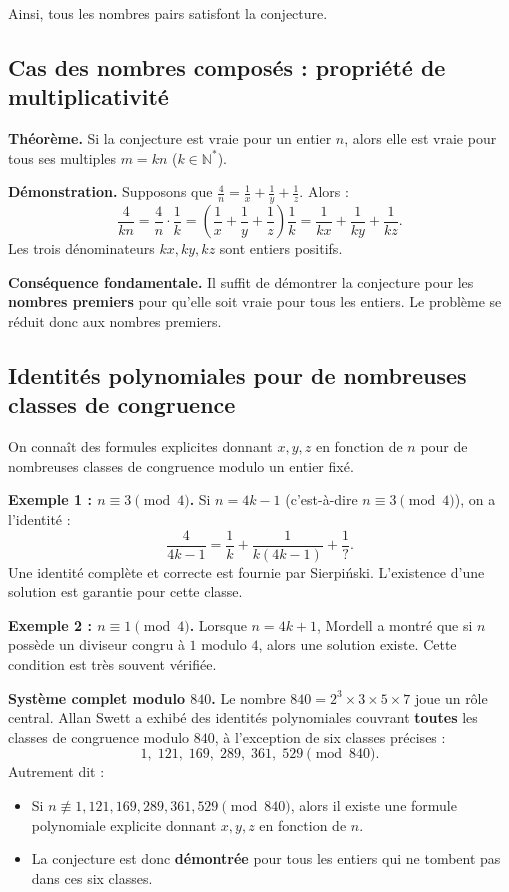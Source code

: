 \documentclass[12pt,a4paper]{article}
\begin{document}
\medskip
Ainsi, tous les nombres pairs satisfont la conjecture.

\subsection{Cas des nombres composés : propriété de multiplicativité}

\textbf{Théorème.} Si la conjecture est vraie pour un entier $n$, alors elle est vraie pour tous ses multiples $m = kn$ ($k \in \mathbb{N}^*$).

\textbf{Démonstration.} Supposons que $\frac{4}{n} = \frac{1}{x} + \frac{1}{y} + \frac{1}{z}$. Alors :
\[
\frac{4}{kn} = \frac{4}{n} \cdot \frac{1}{k}
= \left( \frac{1}{x} + \frac{1}{y} + \frac{1}{z} \right) \frac{1}{k}
= \frac{1}{kx} + \frac{1}{ky} + \frac{1}{kz}.
\]
Les trois dénominateurs $kx, ky, kz$ sont entiers positifs.

\medskip
\textbf{Conséquence fondamentale.} Il suffit de démontrer la conjecture pour les \textbf{nombres premiers} pour qu'elle soit vraie pour tous les entiers. Le problème se réduit donc aux nombres premiers.

\subsection{Identités polynomiales pour de nombreuses classes de congruence}

On connaît des formules explicites donnant $x, y, z$ en fonction de $n$ pour de nombreuses classes de congruence modulo un entier fixé.

\medskip
\textbf{Exemple 1 : $n \equiv 3 \pmod{4}$.}
Si $n = 4k - 1$ (c'est-à-dire $n \equiv 3 \pmod{4}$), on a l'identité :
\[
\frac{4}{4k-1} = \frac{1}{k} + \frac{1}{k(4k-1)} + \frac{1}{\text{?}}.
\]
Une identité complète et correcte est fournie par Sierpiński. L'existence d'une solution est garantie pour cette classe.

\medskip
\textbf{Exemple 2 : $n \equiv 1 \pmod{4}$.}
Lorsque $n = 4k+1$, Mordell a montré que si $n$ possède un diviseur congru à $1$ modulo $4$, alors une solution existe. Cette condition est très souvent vérifiée.

\medskip
\textbf{Système complet modulo $840$.}
Le nombre $840 = 2^3 \times 3 \times 5 \times 7$ joue un rôle central. Allan Swett a exhibé des identités polynomiales couvrant \textbf{toutes} les classes de congruence modulo $840$, à l'exception de six classes précises :
\[
1,\; 121,\; 169,\; 289,\; 361,\; 529 \pmod{840}.
\]
Autrement dit :
\begin{itemize}
    \item Si $n \not\equiv 1, 121, 169, 289, 361, 529 \pmod{840}$, alors il existe une formule polynomiale explicite donnant $x, y, z$ en fonction de $n$.
    \item La conjecture est donc \textbf{démontrée} pour tous les entiers qui ne tombent pas dans ces six classes.
\end{itemize}
\end{document}
